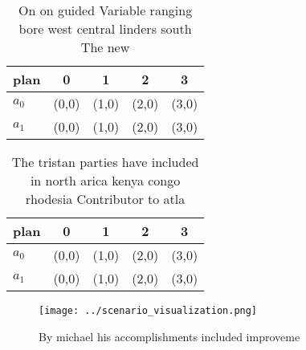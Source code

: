 \documentclass[a4paper]{article}
\begin{document}
\begin{table}
\begin{adjustbox}{width=0.5\columnwidth}
\begin{tabular}{|l|l|l|l|l|}
\hline
\textbf{plan} & \multicolumn{1}{c|}{\textbf{0}} & \multicolumn{1}{c|}{\textbf{1}} & \multicolumn{1}{c|}{\textbf{2}} & \multicolumn{1}{c|}{\textbf{3}} \\ \hline
\textbf{$a_0$}  & (0,0) & (1,0) & (2,0) & (3,0) \\ \hline
\textbf{$a_1$}  & (0,0) & (1,0) & (2,0) & (3,0) \\ \hline
\end{tabular}
\end{adjustbox}
\caption{On on guided Variable ranging bore west central linders south The new
}
\end{table}

\begin{table}
\begin{adjustbox}{width=0.5\columnwidth}
\begin{tabular}{|l|l|l|l|l|}
\hline
\textbf{plan} & \multicolumn{1}{c|}{\textbf{0}} & \multicolumn{1}{c|}{\textbf{1}} & \multicolumn{1}{c|}{\textbf{2}} & \multicolumn{1}{c|}{\textbf{3}} \\ \hline
\textbf{$a_0$}  & (0,0) & (1,0) & (2,0) & (3,0) \\ \hline
\textbf{$a_1$}  & (0,0) & (1,0) & (2,0) & (3,0) \\ \hline
\end{tabular}
\end{adjustbox}
\caption{The tristan parties have included in north arica kenya congo rhodesia Contributor to atla
}
\end{table}

\begin{figure}
\centering
\texttt{[image: ../scenario\_visualization.png]}
\caption{By michael his accomplishments included improveme
}
\end{figure}
 
\end{document}
